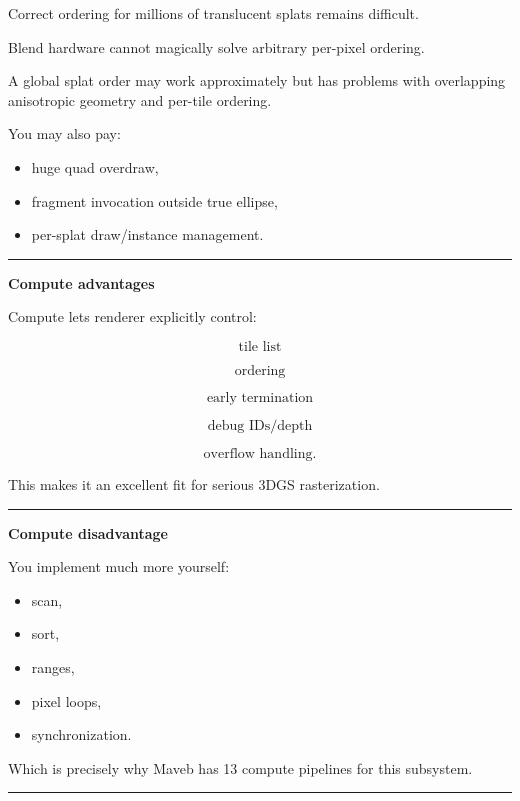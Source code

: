 Correct ordering for millions of translucent splats remains difficult.

Blend hardware cannot magically solve arbitrary per-pixel ordering.

A global splat order may work approximately but has problems with overlapping anisotropic geometry and per-tile ordering.

You may also pay:

\begin{itemize}
\tightlist
\item
  huge quad overdraw,
\item
  fragment invocation outside true ellipse,
\item
  per-splat draw/instance management.
\end{itemize}

\begin{center}\rule{0.5\linewidth}{0.5pt}\end{center}

\textbf{Compute advantages}

Compute lets renderer explicitly control:

\[
\text{tile list}
\]

\[
\text{ordering}
\]

\[
\text{early termination}
\]

\[
\text{debug IDs/depth}
\]

\[
\text{overflow handling}.
\]

This makes it an excellent fit for serious 3DGS rasterization.

\begin{center}\rule{0.5\linewidth}{0.5pt}\end{center}

\textbf{Compute disadvantage}

You implement much more yourself:

\begin{itemize}
\tightlist
\item
  scan,
\item
  sort,
\item
  ranges,
\item
  pixel loops,
\item
  synchronization.
\end{itemize}

Which is precisely why Maveb has 13 compute pipelines for this subsystem.

\begin{center}\rule{0.5\linewidth}{0.5pt}\end{center}

